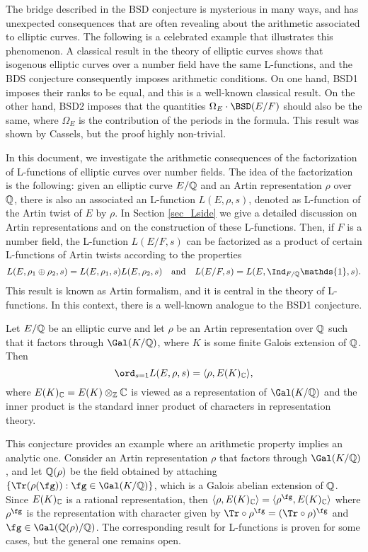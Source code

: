 The bridge described in the BSD conjecture is mysterious in many ways, and has unexpected consequences that are often revealing about the arithmetic associated to elliptic curves. The following is a celebrated example that illustrates this phenomenon. A classical result in the theory of elliptic curves shows that isogenous elliptic curves over a number field have the same L-functions, and the BDS conjecture consequently imposes arithmetic conditions. On one hand, BSD1 imposes their ranks to be equal, and this is a well-known classical result. On the other hand, BSD2 imposes that the quantities $\Omega_E\cdot\BSD(E/F)$ should also be the same, where $\Omega_E$ is the contribution of the periods in the formula. This result was shown by Cassels, but the proof highly non-trivial. 

In this document, we investigate the arithmetic consequences of the factorization of L-functions of elliptic curves over number fields. The idea of the factorization is the following: given an elliptic curve $E/\mathbb{Q}$ and an Artin representation $\rho$ over $\mathbb{Q}$, there is also an associated an L-function $L(E,\rho,s)$, denoted as L-function of the Artin twist of $E$ by $\rho$. In Section \ref{sec_Lside} we give a detailed discussion on Artin representations and on the construction of these L-functions. Then, if $F$ is a number field, the L-function $L(E/F,s)$ can be factorized as a product of certain L-functions of Artin twists according to the properties
$$L(E,\rho_1\oplus\rho_2,s)=L(E,\rho_1,s)L(E,\rho_2,s)\quad\text{and}\quad L(E/F,s)=L(E,\Ind_{F/\QQ}\mathds{1},s).$$
This result is known as Artin formalism, and it is central in the theory of L-functions. In this context, there is a well-known analogue to the BSD1 conjecture. 

\begin{conj}\label{conj_BSD1Artin}
    Let $E/\mathbb{Q}$ be an elliptic curve and let $\rho$ be an Artin representation over $\mathbb{Q}$ such that it factors through $\Gal(K/\QQ)$, where $K$ is some finite Galois extension of $\mathbb{Q}$. Then
    $$\ord_{s=1}L(E,\rho,s)=\langle\rho,E(K)_{\CC}\rangle,$$
    where $E(K)_{\mathbb{C}}=E(K)\otimes_{\mathbb{Z}}\mathbb{C}$ is viewed as a representation of $\Gal(K/\QQ)$ and the inner product is the standard inner product of characters in representation theory.
\end{conj}

This conjecture provides an example where an arithmetic property implies an analytic one. Consider an Artin representation $\rho$ that factors through $\Gal(K/\QQ)$, and let $\mathbb{Q}(\rho)$ be the field obtained by attaching $\{\Tr(\rho(\fg)):\fg\in\Gal(K/\QQ)\}$, which is a Galois abelian extension of $\mathbb{Q}$. Since $E(K)_{\mathbb{C}}$ is a rational representation, then $\langle\rho,E(K)_{\CC}\rangle=\langle\rho^{\fg},E(K)_{\CC}\rangle$ where $\rho^{\fg}$ is the representation with character given by $\Tr\circ\rho^{\fg}=(\Tr\circ\rho)^{\fg}$ and $\fg\in\Gal(\QQ(\rho)/\QQ)$. The corresponding result for L-functions is proven for some cases, but the general one remains open.


